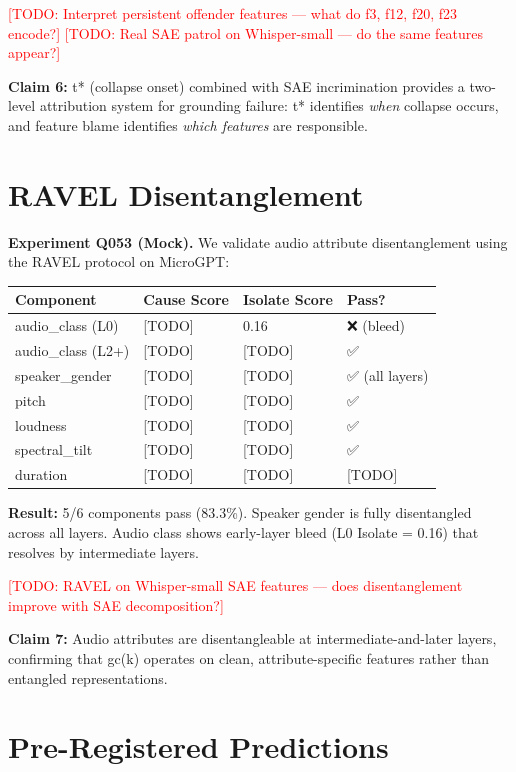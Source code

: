 \documentclass[a4paper]{article}
\begin{document}
{{\textcolor{red}{[TODO: Interpret persistent offender features — what do f3, f12, f20, f23 encode?]}
\textcolor{red}{[TODO: Real SAE patrol on Whisper-small — do the same features appear?]}

\textbf{Claim 6:} t* (collapse onset) combined with SAE incrimination provides a two-level attribution system for grounding failure: t* identifies \textit{when} collapse occurs, and feature blame identifies \textit{which features} are responsible.


\section{RAVEL Disentanglement}

\textbf{Experiment Q053 (Mock).} We validate audio attribute disentanglement using the RAVEL protocol on MicroGPT:

\begin{table}[htbp]
\centering
\begin{tabular}{llll}
\toprule
Component & Cause Score & Isolate Score & Pass? \\
\midrule
audio_class (L0) & [TODO] & 0.16 & ❌ (bleed) \\
audio_class (L2+) & [TODO] & [TODO] & ✅ \\
speaker_gender & [TODO] & [TODO] & ✅ (all layers) \\
pitch & [TODO] & [TODO] & ✅ \\
loudness & [TODO] & [TODO] & ✅ \\
spectral_tilt & [TODO] & [TODO] & ✅ \\
duration & [TODO] & [TODO] & [TODO] \\
\bottomrule
\end{tabular}
\end{table}

\textbf{Result:} 5/6 components pass (83.3\%). Speaker gender is fully disentangled across all layers. Audio class shows early-layer bleed (L0 Isolate = 0.16) that resolves by intermediate layers.

\textcolor{red}{[TODO: RAVEL on Whisper-small SAE features — does disentanglement improve with SAE decomposition?]}

\textbf{Claim 7:} Audio attributes are disentangleable at intermediate-and-later layers, confirming that gc(k) operates on clean, attribute-specific features rather than entangled representations.


\section{Pre-Registered Predictions}

}}
\end{document}
